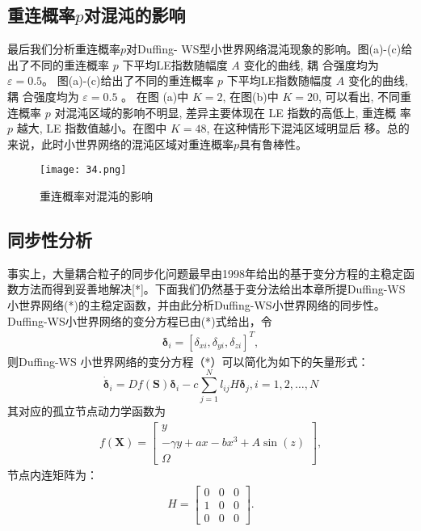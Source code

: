 \subsection*{重连概率$p$对混沌的影响}
最后我们分析重连概率$p$对Duffing- WS型小世界网络混沌现象的影响。图(a)-(c)给出了不同的重连概率
 $p$ 下平均LE指数随幅度 $A$ 变化的曲线, 耦 合强度均为 $\varepsilon=0.5$。
图(a)-(c)给出了不同的重连概率 $p$ 下平均LE指数随幅度 $A$ 变化的曲线, 耦 合强度均为 $\varepsilon=0.5$ 。
在图 (a)中 $K=2$, 在图(b)中 $K=20$, 可以看出, 不同重 连概率 $p$ 对混沌区域的影响不明显, 
差异主要体现在 LE 指数的高低上, 重连概 率 $p$ 越大, LE 指数值越小。在图中 $K=48$, 在这种情形下混沌区域明显后
移。总的来说，此时小世界网络的混沌区域对重连概率$p$具有鲁棒性。
\begin{figure}[!htbp]
    \centering
    \texttt{[image: 34.png]}
    \caption{重连概率对混沌的影响}
\end{figure}
\subsection{同步性分析}
事实上，大量耦合粒子的同步化问题最早由1998年给出的基于变分方程的主稳定函数方法而得到妥善地解决[*]。下面我们仍然基于变分法给出本章所提Duffing-WS小世界网络(*)的主稳定函数，并由此分析Duffing-WS小世界网络的同步性。
Duffing-WS小世界网络的变分方程已由(*)式给出，令
\begin{eqnarray*}
\boldsymbol{\delta}_{i}=\left[\delta_{xi}, \delta_{yi}, \delta_{zi}\right]^T,
\end{eqnarray*}
则Duffing-WS 小世界网络的变分方程（*）可以简化为如下的矢量形式：
\begin{equation}
    \dot{\boldsymbol{\delta}}_i=D f(\mathbf{S}) \boldsymbol{\delta}_i-c \sum_{j=1}^N l_{i j} H \boldsymbol{\delta}_j, i=1,2, \ldots, N
\end{equation}
其对应的孤立节点动力学函数为
\begin{eqnarray*}
 f(\mathbf{X})=\left[\begin{array}{c}y \\ -\gamma y+a x-b x^3+A \sin (z) \\ \Omega\end{array}\right],
\end{eqnarray*}
节点内连矩阵为：
\begin{eqnarray*}
H=\left[\begin{array}{lll}
0 & 0 & 0 \\
1 & 0 & 0 \\
0 & 0 & 0
\end{array}\right].
\end{eqnarray*}

